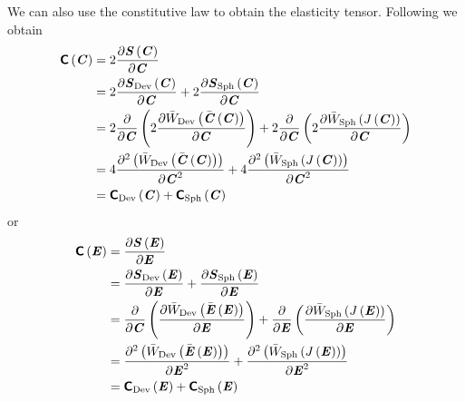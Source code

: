 We can also use the constitutive law to obtain the elasticity
tensor. Following \citet{holzapfel:2000} we obtain
\begin{equation}
  \begin{split}
    \fnof{\tensorfour{C}}{\tensor{C}}&=2\delby{\fnof{\tensor{S}}{\tensor{C}}}{\tensor{C}}\\
    &=2\delby{\fnof{\tensortwo{S}_{\Devop}}{\tensortwo{C}}}{\tensortwo{C}}+2\delby{\fnof{\tensortwo{S}_{\Sphop}}{\tensortwo{C}}}{\tensortwo{C}}\\
    &=2\delby{}{\tensortwo{C}}\pbrac{2\delby{\fnof{\bar{W}_{\Devop}}{\fnof{\bar{\tensortwo{C}}}{\tensortwo{C}}}}{\tensortwo{C}}}+2\delby{}{\tensortwo{C}}\pbrac{2\delby{\fnof{\bar{W}_{\Sphop}}{\fnof{J}{\tensortwo{C}}}}{\tensortwo{C}}}\\
    &=4\deltwosqby{\pbrac{\fnof{\bar{W}_{\Devop}}{\fnof{\bar{\tensor{C}}}{\tensortwo{C}}}}}{\tensor{C}}+4\deltwosqby{\pbrac{\fnof{\bar{W}_{\Sphop}}{\fnof{J}{\tensortwo{C}}}}}{\tensortwo{C}}
    \\
    &=\fnof{\tensorfour{C}_{\Devop}}{\tensortwo{C}}+\fnof{\tensorfour{C}_{\Sphop}}{\tensortwo{C}}
  \end{split}
\end{equation}
or
\begin{equation}
  \begin{split}
    \fnof{\tensorfour{C}}{\tensor{E}}&=\delby{\fnof{\tensor{S}}{\tensor{E}}}{\tensor{E}}\\
    &=\delby{\fnof{\tensortwo{S}_{\Devop}}{\tensortwo{E}}}{\tensortwo{E}}+\delby{\fnof{\tensortwo{S}_{\Sphop}}{\tensortwo{E}}}{\tensortwo{E}}\\
    &=\delby{}{\tensortwo{C}}\pbrac{\delby{\fnof{\bar{W}_{\Devop}}{\fnof{\bar{\tensortwo{E}}}{\tensortwo{E}}}}{\tensortwo{E}}}+\delby{}{\tensortwo{E}}\pbrac{\delby{\fnof{\bar{W}_{\Sphop}}{\fnof{J}{\tensortwo{E}}}}{\tensortwo{E}}}\\
    &=\deltwosqby{\pbrac{\fnof{\bar{W}_{\Devop}}{\fnof{\bar{\tensor{E}}}{\tensortwo{E}}}}}{\tensor{E}}+\deltwosqby{\pbrac{\fnof{\bar{W}_{\Sphop}}{\fnof{J}{\tensortwo{E}}}}}{\tensortwo{E}}
    \\
    &=\fnof{\tensorfour{C}_{\Devop}}{\tensortwo{E}}+\fnof{\tensorfour{C}_{\Sphop}}{\tensortwo{E}}
  \end{split}
\end{equation}

